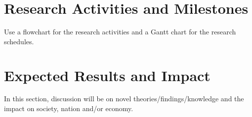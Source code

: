 \documentclass[a4paper, 12pt]{article}
\begin{document}
\section{Research Activities and Milestones}
Use a flowchart for the research activities and a Gantt chart for the research schedules. 

\section{Expected Results and Impact}
In this section, discussion will be on novel theories/findings/knowledge and the impact on society, nation and/or economy.

\printbibliography
\end{document}
